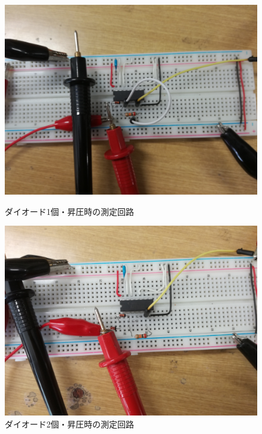 \documentclass[10pt, a4j, dvipdfmx]{jarticle}
\makeatletter
\newcommand{\figcaption}[1]{\def\@captype{figure}\caption{#1}}
\makeatother
\begin{document}
\begin{figure}[H]
  \begin{minipage}{0.5\hsize}
    \centering
    \includegraphics[width=0.9\hsize]{images/camera/5_1_1_camera.jpg}
    \figcaption{ダイオード1個・昇圧時の測定回路}
	\label{fig:5.1.1.camera}
  \end{minipage}
  \begin{minipage}{0.5\hsize}
    \centering
    \includegraphics[height=0.9\hsize, angle=270]{images/camera/5_1_2_camera.jpg}
    \caption{ダイオード2個・昇圧時の測定回路}
	\label{fig:5.1.2.camera}
  \end{minipage}
\end{figure}
\end{document}
